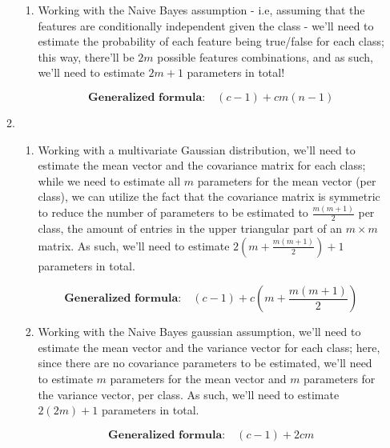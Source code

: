\documentclass[12pt]{article}
\begin{document}
\begin{enumerate}[leftmargin=\labelsep]
\begin{enumerate}
{\begin{enumerate}
{                        $$
                          \textbf{Generalized formula:} \quad (c - 1) + c (n^m - 1)
                        $$
                        }
                  \item {
                        Working with the Naive Bayes assumption - i.e, assuming that the features
                        are conditionally independent given the class - we'll need to estimate
                        the probability of each feature being true/false for each class;
                        this way, there'll be $2m$ possible features combinations, and as such,
                        we'll need to estimate $2m + 1$ parameters in total!

                        $$
                          \textbf{Generalized formula:} \quad (c - 1) + cm(n - 1)
                        $$
                        }
                \end{enumerate}
                }
          \item {
                \begin{enumerate}
                  \item {
                        Working with a multivariate Gaussian distribution, we'll need to estimate
                        the mean vector and the covariance matrix for each class; while we need
                        to estimate all $m$ parameters for the mean vector (per class), we can utilize the
                        fact that the covariance matrix is symmetric to reduce the number of
                        parameters to be estimated to $\frac{m(m+1)}{2}$ per class, the amount of entries
                        in the upper triangular part of an $m \times m$ matrix. As such, we'll
                        need to estimate $2(m + \frac{m(m+1)}{2}) + 1$ parameters in total.

                        $$
                          \textbf{Generalized formula:} \quad (c - 1) + c \left(m + \frac{m(m+1)}{2}\right)
                        $$
                        }
                  \item {
                        Working with the Naive Bayes gaussian assumption, we'll need to estimate
                        the mean vector and the variance vector for each class; here, since
                        there are no covariance parameters to be estimated, we'll need to
                        estimate $m$ parameters for the mean vector and $m$ parameters for the
                        variance vector, per class. As such, we'll need to estimate $2(2m) + 1$
                        parameters in total.

                        $$
                          \textbf{Generalized formula:} \quad (c - 1) + 2cm
                        $$
                        }
                \end{enumerate}
                }
        \end{enumerate}

\end{enumerate}
\end{document}
